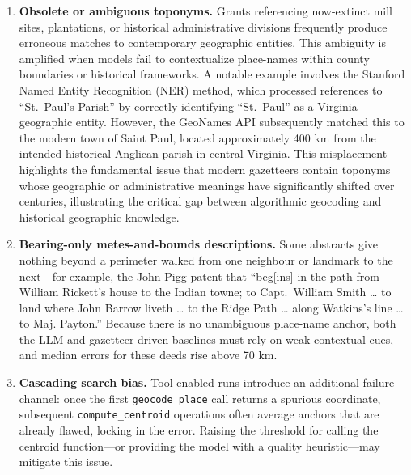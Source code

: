 \begin{enumerate}
\def\labelenumi{\arabic{enumi}.}
\item
  \textbf{Obsolete or ambiguous toponyms.} Grants referencing
  now-extinct mill sites, plantations, or historical administrative
  divisions frequently produce erroneous matches to contemporary
  geographic entities. This ambiguity is amplified when models fail to
  contextualize place-names within county boundaries or historical
  frameworks. A notable example involves the Stanford Named Entity
  Recognition (NER) method, which processed references to ``St.~Paul's
  Parish'' by correctly identifying ``St.~Paul'' as a Virginia
  geographic entity. However, the GeoNames API subsequently matched this
  to the modern town of Saint Paul, located approximately 400 km from
  the intended historical Anglican parish in central Virginia. This
  misplacement highlights the fundamental issue that modern gazetteers
  contain toponyms whose geographic or administrative meanings have
  significantly shifted over centuries, illustrating the critical gap
  between algorithmic geocoding and historical geographic knowledge.
\item
  \textbf{Bearing-only metes-and-bounds descriptions.} Some abstracts
  give nothing beyond a perimeter walked from one neighbour or landmark
  to the next---for example, the John Pigg patent that ``beg{[}ins{]} in
  the path from William Rickett's house to the Indian towne; to
  Capt.~William Smith \ldots{} to land where John Barrow liveth \ldots{}
  to the Ridge Path \ldots{} along Watkins's line \ldots{} to Maj.
  Payton.'' Because there is no unambiguous place-name anchor, both the
  LLM and gazetteer-driven baselines must rely on weak contextual cues,
  and median errors for these deeds rise above 70 km.
\item
  \textbf{Cascading search bias.} Tool-enabled runs introduce an
  additional failure channel: once the first \texttt{geocode\_place}
  call returns a spurious coordinate, subsequent
  \texttt{compute\_centroid} operations often average anchors that are
  already flawed, locking in the error. Raising the threshold for
  calling the centroid function---or providing the model with a quality
  heuristic---may mitigate this issue.
\end{enumerate}

